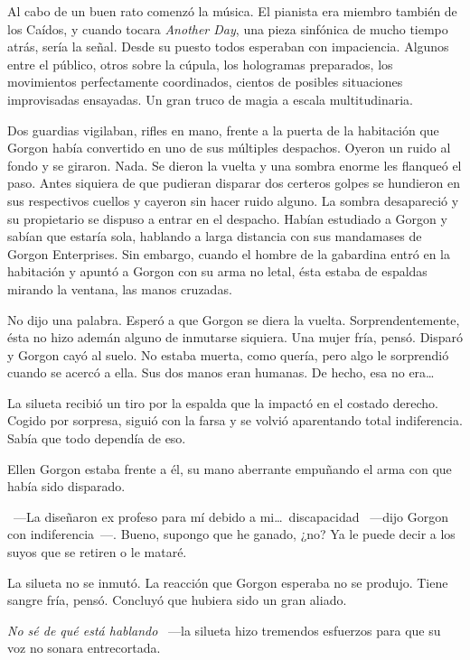 \bigskip\noindent
Al cabo de un buen rato comenzó la música. El pianista era miembro también de los Caídos, y cuando tocara \emph{Another Day}, una pieza sinfónica de mucho tiempo atrás, sería la señal. Desde su puesto todos esperaban con impaciencia. Algunos entre el público, otros sobre la cúpula, los hologramas preparados, los movimientos perfectamente coordinados, cientos de posibles situaciones improvisadas ensayadas. Un gran truco de magia a escala multitudinaria.

Dos guardias vigilaban, rifles en mano, frente a la puerta de la habitación que Gorgon había convertido en uno de sus múltiples despachos. Oyeron un ruido al fondo y se giraron. Nada. Se dieron la vuelta y una sombra enorme les flanqueó el paso. Antes siquiera de que pudieran disparar dos certeros golpes se hundieron en sus respectivos cuellos y cayeron sin hacer ruido alguno. La sombra desapareció y su propietario se dispuso a entrar en el despacho. Habían estudiado a Gorgon y sabían que estaría sola, hablando a larga distancia con sus mandamases de Gorgon Enterprises. Sin embargo, cuando el hombre de la gabardina entró en la habitación y apuntó a Gorgon con su arma no letal, ésta estaba de espaldas mirando la ventana, las manos cruzadas.

No dijo una palabra. Esperó a que Gorgon se diera la vuelta. Sorprendentemente, ésta no hizo ademán alguno de inmutarse siquiera. Una mujer fría, pensó. Disparó y Gorgon cayó al suelo. No estaba muerta, como quería, pero algo le sorprendió cuando se acercó a ella. Sus dos manos eran humanas. De hecho, esa no era\dots

La silueta recibió un tiro por la espalda que la impactó en el costado derecho. Cogido por sorpresa, siguió con la farsa y se volvió aparentando total indiferencia. Sabía que todo dependía de eso.

Ellen Gorgon estaba frente a él, su mano aberrante empuñando el arma con que había sido disparado.

~---La diseñaron ex profeso para mí debido a mi\dots\ discapacidad ~---dijo Gorgon con indiferencia~---. Bueno, supongo que he ganado, ¿no? Ya le puede decir a los suyos que se retiren o le mataré.

La silueta no se inmutó. La reacción que Gorgon esperaba no se produjo. Tiene sangre fría, pensó. Concluyó que hubiera sido un gran aliado.

\emph{No sé de qué está hablando} ~---la silueta hizo tremendos esfuerzos para que su voz no sonara entrecortada.

